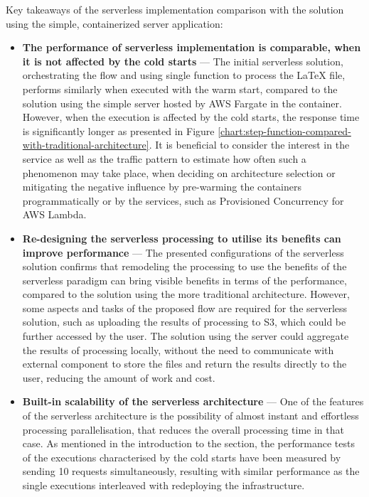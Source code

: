 Key takeaways of the serverless implementation comparison with the solution using the simple, containerized server application:

\begin{itemize}
    \item \textbf{The performance of serverless implementation is comparable, when it is not affected by the cold starts} --- The initial serverless solution, orchestrating the flow and using single function to process the LaTeX file, performs similarly when executed with the warm start, compared to the solution using the simple server hosted by AWS Fargate in the container. However, when the execution is affected by the cold starts, the response time is significantly longer as presented in Figure \ref{chart:step-function-compared-with-traditional-architecture}.
    It is beneficial to consider the interest in the service as well as the traffic pattern to estimate how often such a phenomenon may take place, when deciding on architecture selection or mitigating the negative influence by pre-warming the containers programmatically or by the services, such as Provisioned Concurrency for AWS Lambda.
    \item \textbf{Re-designing the serverless processing to utilise its benefits can improve performance} --- The presented configurations of the serverless solution confirms that remodeling the processing to use the benefits of the serverless paradigm can bring visible benefits in terms of the performance, compared to the solution using the more traditional architecture.
    However, some aspects and tasks of the proposed flow are required for the serverless solution, such as uploading the results of processing to S3, which could be further accessed by the user.
    The solution using the server could aggregate the results of processing locally, without the need to communicate with external component to store the files and return the results directly to the user, reducing the amount of work and cost.
    \item \textbf{Built-in scalability of the serverless architecture} --- One of the features of the serverless architecture is the possibility of almost instant and effortless processing parallelisation, that reduces the overall processing time in that case.
    As mentioned in the introduction to the section, the performance tests of the executions characterised by the cold starts have been measured by sending 10 requests simultaneously, resulting with similar performance as the single executions interleaved with redeploying the infrastructure. 

\end{itemize}
